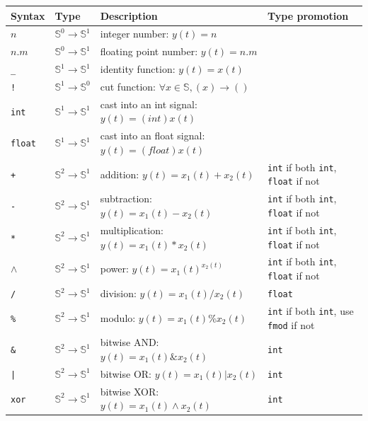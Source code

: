 \begin{tabular}{|l|l|l|l|}
\hline
\textbf{Syntax} & \textbf{Type}  & \textbf{Description}   & \textbf{Type promotion} \\
\hline
$n$ & $\mathbb{S}^{0}\rightarrow\mathbb{S}^{1}$ & integer number: $y(t)=n$ 			&  \\
$n.m$ & $\mathbb{S}^{0}\rightarrow\mathbb{S}^{1}$ & floating point number: $y(t)=n.m$	&  \\

\texttt{\_} & $\mathbb{S}^{1}\rightarrow\mathbb{S}^{1}$ & identity function: $y(t)=x(t)$	&  \\
\texttt{!} & $\mathbb{S}^{1}\rightarrow\mathbb{S}^{0}$ & cut function: $\forall x\in\mathbb{S},(x)\rightarrow ()$	&  \\

\texttt{int} & $\mathbb{S}^{1}\rightarrow\mathbb{S}^{1}$ & cast into an int signal: $y(t)=(int)x(t)$  		&  \\
\texttt{float} & $\mathbb{S}^{1}\rightarrow\mathbb{S}^{1}$ & cast into an float signal: $y(t)=(float)x(t)$  	&  \\

\texttt{+} & $\mathbb{S}^{2}\rightarrow\mathbb{S}^{1}$ & addition: $y(t)=x_{1}(t)+x_{2}(t)$ 		& \texttt{int} if both \texttt{int}, \texttt{float} if not \\
\texttt{-} & $\mathbb{S}^{2}\rightarrow\mathbb{S}^{1}$ & subtraction: $y(t)=x_{1}(t)-x_{2}(t)$  		& \texttt{int} if both \texttt{int}, \texttt{float} if not \\
\texttt{*} & $\mathbb{S}^{2}\rightarrow\mathbb{S}^{1}$ & multiplication: $y(t)=x_{1}(t)*x_{2}(t)$  		& \texttt{int} if both \texttt{int}, \texttt{float} if not \\
\texttt{$\land$} & $\mathbb{S}^{2}\rightarrow\mathbb{S}^{1}$ & power: $y(t)=x_{1}(t)^{x_{2}(t)}$ 	& \texttt{int} if both \texttt{int}, \texttt{float} if not \\
\texttt{/} & $\mathbb{S}^{2}\rightarrow\mathbb{S}^{1}$ & division: $y(t)=x_{1}(t)/x_{2}(t)$  			& \texttt{float} \\
\texttt{\%} & $\mathbb{S}^{2}\rightarrow\mathbb{S}^{1}$ & modulo: $y(t)=x_{1}(t)\%x_{2}(t)$  		&  \texttt{int} if both \texttt{int}, use \texttt{fmod} if not \\

\texttt{\&} & $\mathbb{S}^{2}\rightarrow\mathbb{S}^{1}$ & bitwise AND: $y(t)=x_{1}(t)\&x_{2}(t)$  		& \texttt{int} \\
\texttt{|} & $\mathbb{S}^{2}\rightarrow\mathbb{S}^{1}$ & bitwise OR: $y(t)=x_{1}(t)|x_{2}(t)$  			& \texttt{int} \\
\texttt{xor} & $\mathbb{S}^{2}\rightarrow\mathbb{S}^{1}$ & bitwise XOR: $y(t)=x_{1}(t)\land x_{2}(t)$   	& \texttt{int} \\


\end{tabular}
